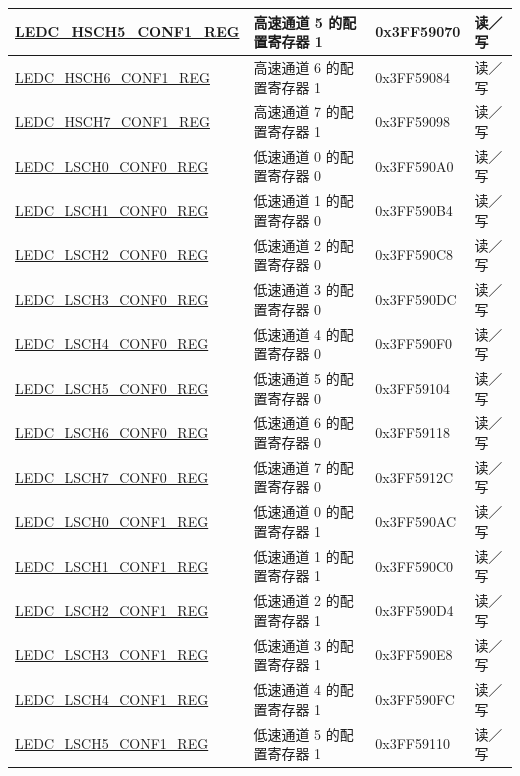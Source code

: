 \begin{longtable}{ | p{5cm} | p{7cm} | p{2.2cm} | p{1.2cm} | }
\hyperref[regdesc:LEDCHSCHnCONF1REG]{LEDC\_HSCH5\_CONF1\_REG} & 高速通道 5 的配置寄存器 1 & 0x3FF59070 & 读／写\\ \hline
\hyperref[regdesc:LEDCHSCHnCONF1REG]{LEDC\_HSCH6\_CONF1\_REG} & 高速通道 6 的配置寄存器 1 & 0x3FF59084 & 读／写 \\ \hline
\hyperref[regdesc:LEDCHSCHnCONF1REG]{LEDC\_HSCH7\_CONF1\_REG} & 高速通道 7 的配置寄存器 1 & 0x3FF59098 & 读／写 \\ \hline
\hyperref[regdesc:LEDCLSCHnCONF0REG]{LEDC\_LSCH0\_CONF0\_REG} & 低速通道 0 的配置寄存器 0 & 0x3FF590A0 & 读／写\\ \hline
\hyperref[regdesc:LEDCLSCHnCONF0REG]{LEDC\_LSCH1\_CONF0\_REG} & 低速通道 1 的配置寄存器 0 & 0x3FF590B4 & 读／写\\ \hline
\hyperref[regdesc:LEDCLSCHnCONF0REG]{LEDC\_LSCH2\_CONF0\_REG} & 低速通道 2 的配置寄存器 0 & 0x3FF590C8 &读／写\\ \hline
\hyperref[regdesc:LEDCLSCHnCONF0REG]{LEDC\_LSCH3\_CONF0\_REG} & 低速通道 3 的配置寄存器 0 & 0x3FF590DC & 读／写 \\ \hline
\hyperref[regdesc:LEDCLSCHnCONF0REG]{LEDC\_LSCH4\_CONF0\_REG} & 低速通道 4 的配置寄存器 0 & 0x3FF590F0 & 读／写 \\ \hline
\hyperref[regdesc:LEDCLSCHnCONF0REG]{LEDC\_LSCH5\_CONF0\_REG} & 低速通道 5 的配置寄存器 0 & 0x3FF59104 & 读／写 \\ \hline
\hyperref[regdesc:LEDCLSCHnCONF0REG]{LEDC\_LSCH6\_CONF0\_REG} & 低速通道 6 的配置寄存器 0 & 0x3FF59118 & 读／写 \\ \hline
\hyperref[regdesc:LEDCLSCHnCONF0REG]{LEDC\_LSCH7\_CONF0\_REG} & 低速通道 7 的配置寄存器 0 & 0x3FF5912C & 读／写\\ \hline
\hyperref[regdesc:LEDCLSCHnCONF1REG]{LEDC\_LSCH0\_CONF1\_REG} & 低速通道 0 的配置寄存器 1 & 0x3FF590AC &读／写 \\ \hline
\hyperref[regdesc:LEDCLSCHnCONF1REG]{LEDC\_LSCH1\_CONF1\_REG} & 低速通道 1 的配置寄存器 1 & 0x3FF590C0 & 读／写\\ \hline
\hyperref[regdesc:LEDCLSCHnCONF1REG]{LEDC\_LSCH2\_CONF1\_REG} & 低速通道 2 的配置寄存器 1 & 0x3FF590D4 & 读／写\\ \hline
\hyperref[regdesc:LEDCLSCHnCONF1REG]{LEDC\_LSCH3\_CONF1\_REG} & 低速通道 3 的配置寄存器 1 & 0x3FF590E8 & 读／写 \\ \hline
\hyperref[regdesc:LEDCLSCHnCONF1REG]{LEDC\_LSCH4\_CONF1\_REG} & 低速通道 4 的配置寄存器 1 & 0x3FF590FC &读／写 \\ \hline
\hyperref[regdesc:LEDCLSCHnCONF1REG]{LEDC\_LSCH5\_CONF1\_REG} & 低速通道 5 的配置寄存器 1 & 0x3FF59110 & 读／写 \\ \hline

\end{longtable}
